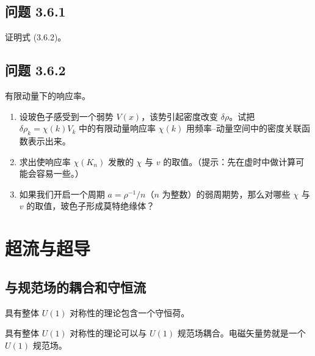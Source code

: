 \subsection*{问题 3.6.1}

证明式 (3.6.2)。

\subsection*{问题 3.6.2}

有限动量下的响应率。
\begin{enumerate}
\item 设玻色子感受到一个弱势 $V(x)$，该势引起密度改变 $\delta\rho$。试把 $\delta\rho_k=\chi(k)V_k$ 中的有限动量响应率 $\chi(k)$ 用频率--动量空间中的密度关联函数表示出来。
\item 求出使响应率 $\chi(K_n)$ 发散的 $\chi$ 与 $v$ 的取值。（提示：先在虚时中做计算可能会容易一些。）
\item 如果我们开启一个周期 $a=\rho^{-1}/n$（$n$ 为整数）的弱周期势，那么对哪些 $\chi$ 与 $v$ 的取值，玻色子形成莫特绝缘体？
\end{enumerate}

\section{超流与超导}

\subsection{与规范场的耦合和守恒流}

\begin{keypoints}
\item 具有整体 $U(1)$ 对称性的理论包含一个守恒荷。
\item 具有整体 $U(1)$ 对称性的理论可以与 $U(1)$ 规范场耦合。电磁矢量势就是一个 $U(1)$ 规范场。
\end{keypoints}

